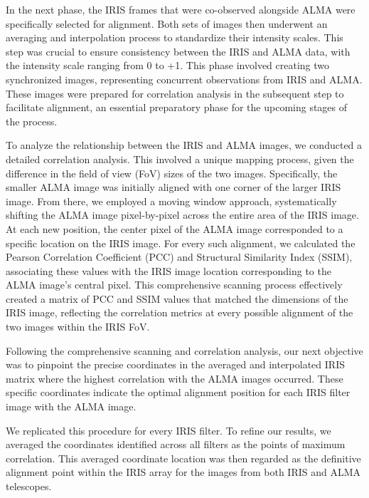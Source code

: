 \documentclass[a4paper,alpha-refs]{eSpectra}
\begin{document}
In the next phase, the IRIS frames that were co-observed alongside ALMA were specifically selected for alignment. Both sets of images then underwent an averaging and interpolation process to standardize their intensity scales. This step was crucial to ensure consistency between the IRIS and ALMA data, with the intensity scale ranging from 0 to +1. This phase involved creating two synchronized images, representing concurrent observations from IRIS and ALMA. These images were prepared for correlation analysis in the subsequent step to facilitate alignment, an essential preparatory phase for the upcoming stages of the process.

To analyze the relationship between the IRIS and ALMA images, we conducted a detailed correlation analysis. This involved a unique mapping process, given the difference in the field of view (FoV) sizes of the two images. Specifically, the smaller ALMA image was initially aligned with one corner of the larger IRIS image. From there, we employed a moving window approach, systematically shifting the ALMA image pixel-by-pixel across the entire area of the IRIS image.  At each new position, the center pixel of the ALMA image corresponded to a specific location on the IRIS image. For every such alignment, we calculated the Pearson Correlation Coefficient (PCC) and Structural Similarity Index (SSIM), associating these values with the IRIS image location corresponding to the ALMA image's central pixel. This comprehensive scanning process effectively created a matrix of PCC and SSIM values that matched the dimensions of the IRIS image, reflecting the correlation metrics at every possible alignment of the two images within the IRIS FoV.

Following the comprehensive scanning and correlation analysis, our next objective was to pinpoint the precise coordinates in the averaged and interpolated IRIS matrix where the highest correlation with the ALMA images occurred. These specific coordinates indicate the optimal alignment position for each IRIS filter image with the ALMA image.

We replicated this procedure for every IRIS filter. To refine our results, we averaged the coordinates identified across all filters as the points of maximum correlation. This averaged coordinate location was then regarded as the definitive alignment point within the IRIS array for the images from both IRIS and ALMA telescopes.
\end{document}
